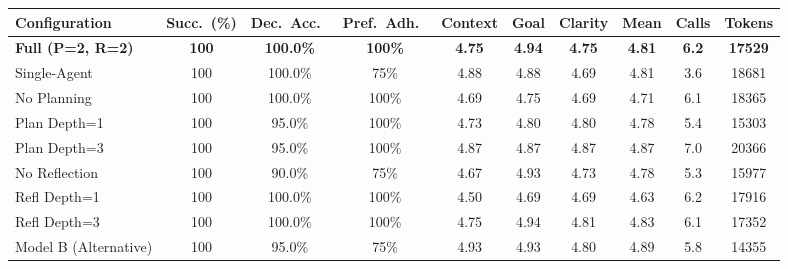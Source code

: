 \begin{tabular}{lccccccccc}
\toprule
Configuration & Succ.\ (\%) & Dec.\ Acc.\ & Pref.\ Adh.\ & Context & Goal & Clarity & Mean & Calls & Tokens \\
\midrule
\textbf{Full (P=2, R=2)} & \textbf{100} & \textbf{100.0\%} & \textbf{100\%} & \textbf{4.75} & \textbf{4.94} & \textbf{4.75} & \textbf{4.81} & \textbf{6.2} & \textbf{17529} \\
Single-Agent & 100 & 100.0\% & 75\% & 4.88 & 4.88 & 4.69 & 4.81 & 3.6 & 18681 \\
No Planning & 100 & 100.0\% & 100\% & 4.69 & 4.75 & 4.69 & 4.71 & 6.1 & 18365 \\
Plan Depth=1 & 100 & 95.0\% & 100\% & 4.73 & 4.80 & 4.80 & 4.78 & 5.4 & 15303 \\
Plan Depth=3 & 100 & 95.0\% & 100\% & 4.87 & 4.87 & 4.87 & 4.87 & 7.0 & 20366 \\
No Reflection & 100 & 90.0\% & 75\% & 4.67 & 4.93 & 4.73 & 4.78 & 5.3 & 15977 \\
Refl Depth=1 & 100 & 100.0\% & 100\% & 4.50 & 4.69 & 4.69 & 4.63 & 6.2 & 17916 \\
Refl Depth=3 & 100 & 100.0\% & 100\% & 4.75 & 4.94 & 4.81 & 4.83 & 6.1 & 17352 \\
Model B (Alternative) & 100 & 95.0\% & 75\% & 4.93 & 4.93 & 4.80 & 4.89 & 5.8 & 14355 \\
\bottomrule
\end{tabular}
